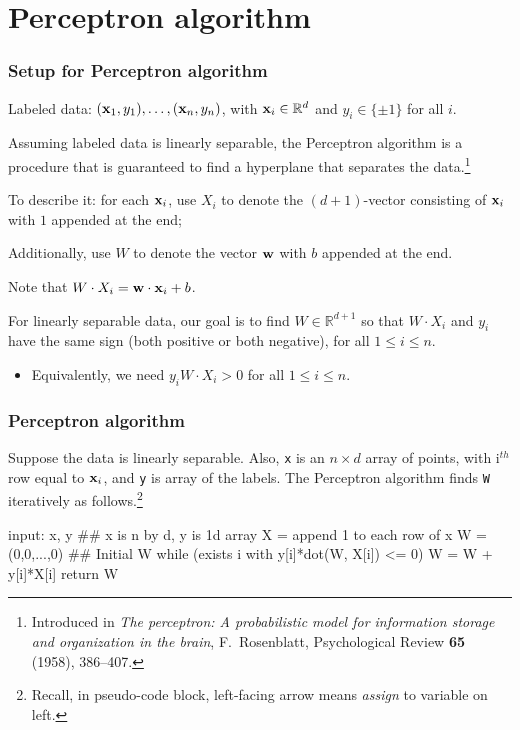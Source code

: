 \documentclass{beamer}
\theoremstyle{example}
\newcommand{\ttt}[1]{{\small\texttt{#1}}}
\begin{document}
\section{Perceptron algorithm}

\begin{frame}
    \frametitle{Setup for Perceptron algorithm}
    Labeled data: $({\bf x}_1, y_1), \ldots, ({\bf x}_n, y_n)$, with ${\bf x}_i\in\mathbb R^d$ and $y_i\in\{\pm1\}$ for all $i$.

    Assuming labeled data is linearly separable, the Perceptron algorithm is a procedure that is guaranteed to find a hyperplane that separates the data.\footnote{Introduced in \textit{The perceptron: A probabilistic model for information storage and organization in the brain}, F.~Rosenblatt, Psychological Review \textbf{65} (1958), 386{--}407.}
    
    \pause
    To describe it: for each ${\bf x}_i$, use $X_i$ to denote the $(d+1)$-vector consisting of ${\bf x}_i$ with $1$ appended at the end;

    Additionally, use $W$ to denote the vector ${\bf w}$ with $b$ appended at the end.

    \pause
    Note that $W\cdot X_i = {\bf w}\cdot{\bf x}_i + b$. 

    For linearly separable data, our goal is to find $W\in\mathbb R^{d+1}$ so that $W\cdot X_i$ and $y_i$ have the same sign (both positive or both negative), for all $1\le i\le n$.
    \begin{itemize}
        \item Equivalently, we need $y_i W\cdot X_i > 0$ for all $1\le i\le n$.
    \end{itemize}
\end{frame}

\begin{frame}[fragile]
\frametitle{Perceptron algorithm}
Suppose the data is linearly separable. Also, \ttt{x} is an $n\times d$ array of points, with i$^{th}$ row equal to ${\bf x}_i$, and \ttt{y} is array of the labels. The Perceptron algorithm finds \ttt{W} iteratively as follows.\footnote{Recall, in pseudo-code block, left-facing arrow means \textit{assign} to variable on left.}
\pause 

\begin{pseudo}
input: x, y  ## x is n by d, y is 1d array
X = append 1 to each row of x
W = (0,0,...,0)  ## Initial W
while (exists i with y[i]*dot(W, X[i]) <= 0){
    W = W + y[i]*X[i]
}
return W
\end{pseudo}

\end{frame}
\end{document}
